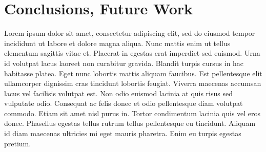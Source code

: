 \chapter*{Conclusions, Future Work} 

Lorem ipsum dolor sit amet, consectetur adipiscing elit, sed do eiusmod tempor incididunt ut labore et dolore magna aliqua. Nunc mattis enim ut tellus elementum sagittis vitae et. Placerat in egestas erat imperdiet sed euismod. Urna id volutpat lacus laoreet non curabitur gravida. Blandit turpis cursus in hac habitasse platea. Eget nunc lobortis mattis aliquam faucibus. Est pellentesque elit ullamcorper dignissim cras tincidunt lobortis feugiat. Viverra maecenas accumsan lacus vel facilisis volutpat est. Non odio euismod lacinia at quis risus sed vulputate odio. Consequat ac felis donec et odio pellentesque diam volutpat commodo. Etiam sit amet nisl purus in. Tortor condimentum lacinia quis vel eros donec. Phasellus egestas tellus rutrum tellus pellentesque eu tincidunt. Aliquam id diam maecenas ultricies mi eget mauris pharetra. Enim eu turpis egestas pretium.